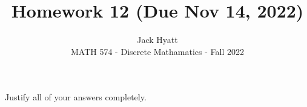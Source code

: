\documentclass[12pt]{article}
\begin{document}
	
	
	
	\title{Homework 12 (Due Nov 14, 2022)}
	\author{Jack Hyatt\\ %
		MATH 574 - Discrete Mathamatics - Fall 2022} 
	
	\maketitle
	
	Justify all of your answers completely.\\
	
	\renewcommand{\qedsymbol}{$\blacksquare$}
	
	\medskip 
\end{document}
